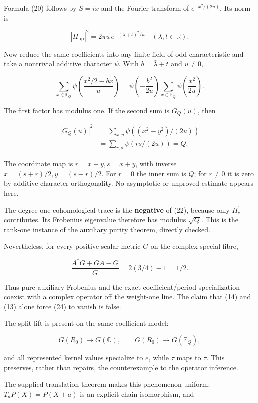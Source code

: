 \documentclass[
  11pt,
]{article}
\begin{document}
Formula (20) follows by \(S=ix\) and the Fourier transform of
\(e^{-x^2/(2u)}\). Its norm is

\[
|\Pi_{\mathrm{up}}|^2=2\pi u\,e^{-(\lambda+t)^2/u}
\quad (\lambda,t\in\mathbb R).
\tag{21}
\]

Now reduce the same coefficients into any finite field of odd
characteristic and take a nontrivial additive character \(\psi\). With
\(b=\bar\lambda+t\) and \(u\ne0\),

\[
\sum_{x\in\mathbb F_Q}\psi\!\left(\frac{x^2/2-bx}{u}\right)
=\psi\!\left(-\frac{b^2}{2u}\right)
\sum_{x\in\mathbb F_Q}\psi\!\left(\frac{x^2}{2u}\right).
\tag{22}
\]

The first factor has modulus one. If the second sum is \(G_Q(u)\), then

\[
\begin{aligned}
|G_Q(u)|^2
&=\sum_{x,y}\psi((x^2-y^2)/(2u))\\
&=\sum_{r,s}\psi(rs/(2u))=Q.
\end{aligned}
\tag{23}
\]

The coordinate map is \(r=x-y,s=x+y\), with inverse
\(x=(s+r)/2,y=(s-r)/2\). For \(r=0\) the inner sum is \(Q\); for
\(r\ne0\) it is zero by additive-character orthogonality. No asymptotic
or unproved estimate appears here.

The degree-one cohomological trace is the \textbf{negative} of (22),
because only \(H_c^1\) contributes. Its Frobenius eigenvalue therefore
has modulus \(\sqrt Q\). This is the rank-one instance of the auxiliary
purity theorem, directly checked.

Nevertheless, for every positive scalar metric \(G\) on the complex
special fibre,

\[
\frac{A^*G+GA-G}{G}=2(3/4)-1=1/2.
\tag{24}
\]

Thus pure auxiliary Frobenius and the exact coefficient/period
specialization coexist with a complex operator off the weight-one line.
The claim that (14) and (13) alone force (24) to vanish is false.

The split lift is present on the same coefficient model:

\[
G(R_0)\longrightarrow G(\mathbb C),\qquad
G(R_0)\longrightarrow G(\mathbb F_Q),
\tag{25}
\]

and all represented kernel values specialize to \(e\), while \(\tau\)
maps to \(\tau\). This preserves, rather than repairs, the
counterexample to the operator inference.

The supplied translation theorem makes this phenomenon uniform:
\(T_aP(X)=P(X+a)\) is an explicit chain isomorphism, and
\end{document}
